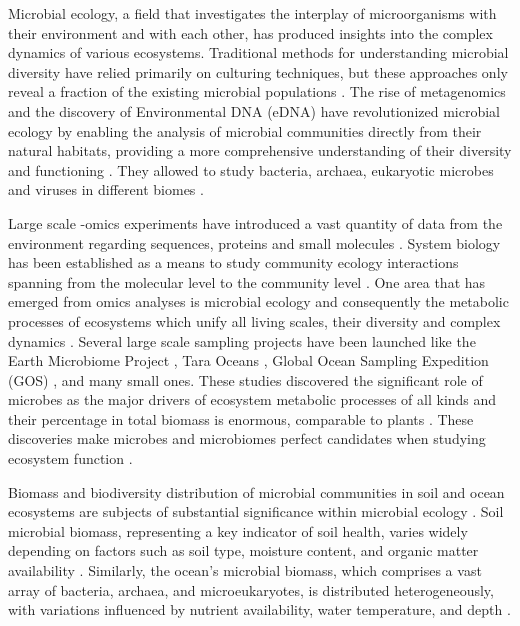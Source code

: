 Microbial ecology, a field that investigates the interplay of microorganisms with
their environment and with each other, has produced insights into
the complex dynamics of various ecosystems.
Traditional methods for understanding microbial diversity have relied primarily
on culturing techniques, but these approaches only reveal a fraction of the
existing microbial populations \parencite{prosser2020Conceptual}.
The rise of metagenomics and the discovery of
Environmental DNA (eDNA) have revolutionized microbial ecology by enabling the
analysis of microbial communities directly from their natural habitats,
providing a more comprehensive understanding of their diversity and
functioning \parencite{raes2008Molecular}. They allowed to 
study bacteria, archaea, eukaryotic microbes and viruses in different biomes \parencite{nayfach2021a-genomic}.

Large scale -omics experiments have introduced a vast quantity of data from the
environment regarding sequences, proteins and small molecules \parencite{shaffer2022Standardized}.
System biology has been established as a means to study community ecology interactions spanning
from the molecular level to the community level \parencite{raes2008Molecular}.
One area that has emerged from omics analyses is microbial ecology and
consequently the metabolic processes of ecosystems \parencite{perez_garcia2016Metabolic}
which unify all living scales, their diversity and complex dynamics \parencite{smith2016Origin}.
Several large scale sampling projects have been launched like the Earth
Microbiome Project \parencite{thompson2017a-communal}, Tara Oceans \parencite{sunagawa2020tara},
Global Ocean Sampling Expedition (GOS) \parencite{Shibu2007}, and
many small ones. These studies discovered the significant role of microbes as the major drivers of ecosystem metabolic
processes of all kinds \parencite{falkowski2008microbial,hall2018understanding} and
their percentage in total biomass is enormous, comparable to plants \parencite{bar2018biomass}.
These discoveries make microbes and microbiomes perfect candidates when
studying ecosystem function \parencite{klitgord2011Ecosystems,widder2016Challenges}.

Biomass and biodiversity distribution of microbial communities in soil and ocean
ecosystems are subjects of substantial significance within microbial ecology \parencite{bar2018biomass}.
Soil microbial biomass, representing a key indicator of soil health, varies
widely depending on factors such as soil type, moisture content, and organic
matter availability \parencite{Crowther2019}. Similarly, the ocean's
microbial biomass, which comprises a vast array of bacteria, archaea, and
microeukaryotes, is distributed heterogeneously, with variations influenced by
nutrient availability, water temperature, and depth \parencite{loucaDecouplingFunctionTaxonomy2016}.

